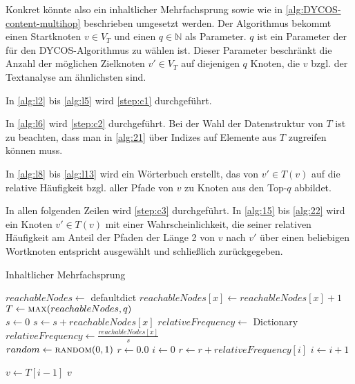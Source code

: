 Konkret könnte also ein inhaltlicher Mehrfachsprung sowie wie in
\cref{alg:DYCOS-content-multihop} beschrieben umgesetzt werden.
Der Algorithmus bekommt einen Startknoten $v \in V_T$ und
einen $q \in \mathbb{N}$ als Parameter. $q$ ist ein Parameter der
für den DYCOS-Algorithmus zu wählen ist. Dieser Parameter beschränkt 
die Anzahl der möglichen Zielknoten $v' \in V_T$ auf diejenigen
$q$ Knoten, die $v$ bzgl. der Textanalyse am ähnlichsten sind.

In \cref{alg:l2} bis \cref{alg:l5} wird \cref{step:c1} durchgeführt.

In \cref{alg:l6} wird \cref{step:c2} durchgeführt. Bei der
Wahl der Datenstruktur von $T$ ist zu beachten, dass man in
\cref{alg:21} über Indizes auf Elemente aus $T$ zugreifen können muss.

In \cref{alg:l8} bis \cref{alg:l13} wird ein Wörterbuch erstellt,
das von $v' \in T(v)$ auf die relative
Häufigkeit bzgl. aller Pfade von $v$ zu Knoten aus den Top-$q$ abbildet.

In allen folgenden Zeilen wird \cref{step:c3} durchgeführt. 
In \cref{alg:15} bis \cref{alg:22} wird ein Knoten $v' \in T(v)$ mit
einer Wahrscheinlichkeit, die seiner relativen Häufigkeit am Anteil
der Pfaden der Länge 2 von $v$ nach $v'$ über einen beliebigen 
Wortknoten entspricht ausgewählt und schließlich zurückgegeben.

\begin{algorithm}
  \caption{Inhaltlicher Mehrfachsprung}
  \label{alg:DYCOS-content-multihop}
    \begin{algorithmic}[1]
            \State $reachableNodes \gets$ defaultdict\label{alg:l2}
                    \State $reachableNodes[x] \gets reachableNodes[x] + 1$
                \EndFor
            \EndFor\label{alg:l5}
            \State \label{alg:l6} $T \gets \Call{max}{reachableNodes, q}$ 
            \\
            \State \label{alg:l8} $s \gets 0$
                \State $s \gets s + reachableNodes[x]$
            \EndFor
            \State $relativeFrequency \gets $ Dictionary
                \State $relativeFrequency \gets \frac{reachableNodes[x]}{s}$
            \EndFor\label{alg:l13} 
            \\
            \State \label{alg:15} $random \gets \Call{random}{0, 1}$
            \State $r \gets 0.0$
            \State $i \gets 0$
                \State $r \gets r + relativeFrequency[i]$
                \State $i \gets i + 1$
            \EndWhile
            
            \State $v \gets T[i-1]$ \label{alg:21}
            \State \Return $v$ \label{alg:22} 
        \EndProcedure
    \end{algorithmic}
\end{algorithm}
